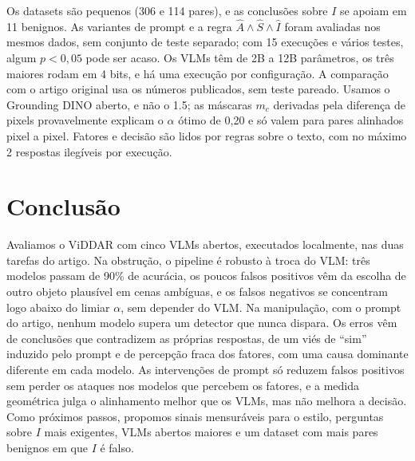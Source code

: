 \documentclass[conference]{IEEEtran}
\begin{document}
Os datasets são pequenos (306 e 114 pares), e as conclusões sobre $I$ se apoiam em 11 benignos. As
variantes de prompt e a regra $\hat A\wedge\hat S\wedge\hat I$ foram avaliadas nos mesmos dados, sem
conjunto de teste separado; com 15 execuções e vários testes, algum $p<0{,}05$ pode ser acaso. Os VLMs
têm de 2B a 12B parâmetros, os três maiores rodam em 4 bits, e há uma execução por configuração. A
comparação com o artigo original usa os números publicados, sem teste pareado. Usamos o Grounding DINO
aberto, e não o 1.5; as máscaras $m_c$ derivadas pela diferença de pixels provavelmente explicam o
$\alpha$ ótimo de 0,20 e só valem para pares alinhados pixel a pixel. Fatores e decisão são lidos por
regras sobre o texto, com no máximo 2 respostas ilegíveis por execução.

\section{Conclusão}

Avaliamos o ViDDAR com cinco VLMs abertos, executados localmente, nas duas tarefas do artigo. Na
obstrução, o pipeline é robusto à troca do VLM: três modelos passam de 90\% de acurácia, os poucos falsos
positivos vêm da escolha de outro objeto plausível em cenas ambíguas, e os falsos negativos se concentram
logo abaixo do limiar $\alpha$, sem depender do VLM. Na manipulação, com o prompt do artigo, nenhum modelo
supera um detector que nunca dispara. Os erros vêm de conclusões que contradizem as próprias respostas,
de um viés de ``sim'' induzido pelo prompt e de percepção fraca dos fatores, com uma causa dominante
diferente em cada modelo. As intervenções de prompt só reduzem falsos positivos sem perder os ataques nos
modelos que percebem os fatores, e a medida geométrica julga o alinhamento melhor que os VLMs, mas não
melhora a decisão. Como próximos passos, propomos sinais mensuráveis para o estilo, perguntas
sobre $I$ mais exigentes, VLMs abertos maiores e um dataset com mais pares benignos em que $I$ é falso.\label{fim-texto}
\end{document}

